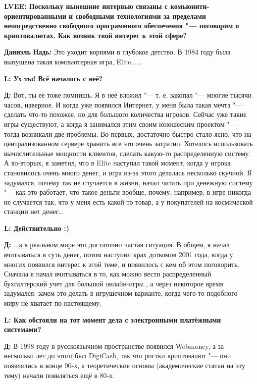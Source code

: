\documentclass[10pt, a5paper]{article}
\begin{document}
{\noindent \bf LVEE: Поскольку нынешние интервью связаны с комьюни\-ти-ориентированными и свободными технологиями за пределами непосредственно свободного программного обеспечения "--- поговорим о криптовалютах. Как возник твой интерес к этой сфере?}

{\noindent \bf Даниэль Надь:} Это уходит корнями в глубокое детство. В 1984 году была выпущена такая компьютерная игра, Elite...\ldots 

{\noindent \bf L: Ух ты! Всё началось с неё?}

{\noindent \bf Д:} Вот, ты её тоже помнишь. Я в неё вложил "--- т. е. закопал "--- многие тысячи часов, наверное. И когда уже появился Интернет, у меня была такая мечта "--- сделать что-то похожее, но для большого количества игроков. Сейчас уже такие игры существуют, а когда я занимался этим  своим юношеским проектом "--- тогда возникали две проблемы. Во-первых, достаточно быстро стало ясно, что на централизованном сервере хранить все это очень затратно. Хотелось использовать вычислительные мощности клиентов, сделать какую-то распределенную систему. А во-вторых, я заметил, что в Elite наступал такой момент, когда у игрока становилось очень много денег, и игра из-за этого делалась несколько скучной. Я задумался, почему так не случается в жизни, начал читать про денежную систему "--- как это работает, что такое деньги вообще, почему, например, в игре никогда не случается так, что у меня есть какой-то товар, а у покупателей на космической станции нет денег\ldots

{\noindent \bf L: Действительно :)} 

{\noindent \bf Д:} ...а в реальном мире это достаточно частая ситуация. В общем, я начал вчитываться в суть денег, потом наступил крах доткомов 2001 года, когда у многих появился интерес к этой теме, и появилось с кем об этом поговорить. Сначала я начал вчитываться в то, как можно вести распределенный бухгалтерский учет для большой онлайн-игры , а через некоторое время задумался: зачем это делать в игрушечном варианте, когда чего-то подобного миру не хватает по-настоящему. 

{\noindent \bf L: Как обстояли на тот момент дела с электронными платёжными системами?}

{\noindent \bf Д:}  В 1998 году в русскоязычном пространстве появился Webmoney, а за несколько лет до этого был DigiCash, так что ростки криптовалют "--- они появлялись в конце 90-х, а теоретические основы (академические статьи на эту тему) начали появляться ещё в 80-х.
\end{document}
